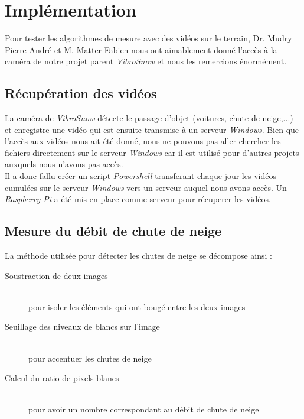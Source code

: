
\section{Implémentation}
Pour tester les algorithmes de mesure avec des vidéos sur le terrain,
Dr. Mudry Pierre-André et M. Matter Fabien nous ont aimablement donné l'accès à
la caméra de notre projet parent \emph{VibroSnow\cite{VibroSnow}} et nous
les remercions énormément.

\subsection{Récupération des vidéos}
La caméra de \emph{VibroSnow} détecte le passage d'objet (voitures, chute de neige,...) et
enregistre une vidéo qui est ensuite transmise à un serveur \emph{Windows}.
Bien que l'accès aux vidéos nous ait été donné, nous ne pouvons pas aller chercher les fichiers
directement sur le serveur \emph{Windows} car il est utilisé pour d'autres projets auxquels nous
n'avons pas accès.\\
Il a donc fallu créer un script \emph{Powershell} transferant chaque jour les vidéos
cumulées sur le serveur \emph{Windows} vers un serveur auquel nous avons accès.
Un \emph{Raspberry Pi} a été mis en place comme serveur pour récuperer les vidéos.

\subsection{Mesure du débit de chute de neige}
La méthode utilisée pour détecter les chutes de neige se décompose ainsi :
\begin{description}
    \item[Soustraction de deux images] \hfill \\
    pour isoler les éléments qui ont bougé entre les deux images
    \item[Seuillage des niveaux de blancs sur l'image] \hfill \\
    pour accentuer les chutes de neige
    \item[Calcul du ratio de pixels blancs] \hfill \\
    pour avoir un nombre correspondant au débit de chute de neige    
\end{description}

